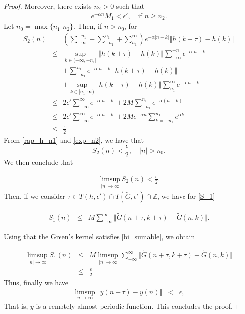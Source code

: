 \documentclass[english,,reqno]{amsart}
\numberwithin{equation}{section}
\theoremstyle{plain}
\theoremstyle{definition}
\theoremstyle{remark}
\begin{document}
\begin{proof}
Moreover, there exists $n_2 > 0$ such that  
\begin{eqnarray}
e^{-\alpha n} M_1 < \epsilon',\quad \text{if } n \geq n_2. \label{exp_n2}
\end{eqnarray}  
Let $n_0 = \max\{n_1, n_2\}$. Then, if $n > n_0$, for
\begin{eqnarray*}
S_2(n) 
&= & \left(\sum_{-\infty}^{-n_1}+\sum_{-n_1}^{n_1}+\sum_{n_1}^{\infty}\right)  e^{-\alpha\vert n-k\vert} \left\Vert h(k+\tau)-h(k)\right\Vert \\
    &\leq & \sup_{k\in(-\infty, -n_1]} \left\Vert h(k+\tau)-h(k)\right\Vert \sum_{-\infty}^{-n_1}  e^{-\alpha\vert n-k\vert} \\
    & & + \sum_{-n_1}^{n_1} e^{-\alpha \vert n-k \vert} \left\Vert h(k+\tau)-h(k) \right\Vert\\
    & &+\sup_{k\in[n_1,\infty)}\left\Vert h(k+\tau)-h(k)\right\Vert \sum_{n_1}^{\infty}  e^{-\alpha\vert n-k\vert} \\
    &\leq & 2\epsilon' \sum_{-\infty}^{\infty}   e^{-\alpha\vert n-k\vert}+ 2M\sum_{-n_1}^{n_1} e^{-\alpha ( n-k)} \\
    &\leq & 2\epsilon'\sum_{-\infty}^{\infty}   e^{-\alpha\vert n-k\vert} + 2M e^{-\alpha n} \sum_{k=-n_1}^{n_1} e^{\alpha k } \\
        &\leq & \frac{\epsilon}{2}
\end{eqnarray*}
From \eqref{rap_h_n1} and \eqref{exp_n2}, we have that  
\[
S_2(n) < \frac{\epsilon}{2},\quad |n| > n_0.
\]  
We then conclude that

\begin{eqnarray*}
\limsup_{\vert n \vert\rightarrow \infty}S_2(n)<\frac{\epsilon}{2}.
\end{eqnarray*}
Then, if we consider $\tau \in T(h, \epsilon') \cap T(\tilde{G}, \epsilon') \cap \mathbb{Z}$, we have for \eqref{S_1}

\begin{eqnarray*}
S_1(n) &\leq & M \sum_{-\infty}^{\infty} \Vert \tilde{G}(n+\tau ,k+\tau)-\tilde{G}(n,k)\Vert.
\end{eqnarray*}

Using that the Green's kernel satisfies \eqref{bi_sumable}, we obtain

\begin{eqnarray*}
\limsup_{\vert n \vert \rightarrow \infty} S_1(n)
 &\leq & M\limsup_{\vert n \vert \rightarrow \infty} \sum_{-\infty}^{\infty} \Vert \tilde{G}(n+\tau ,k+\tau)-\tilde{G}(n,k)\Vert\\
&\leq &  \frac{\epsilon}{2}
 \end{eqnarray*}
Thus, finally we have
\begin{eqnarray*}
\limsup_{n\rightarrow \infty} \left\Vert y(n+\tau)-y(n)\right\Vert  & <&  \epsilon,
\end{eqnarray*}
That is, $y$ is a remotely almost-periodic function.  
This concludes the proof.
\end{proof}
\end{document}
